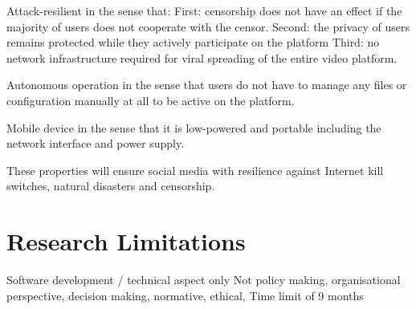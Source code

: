 Attack-resilient in the sense that:
First: censorship does not have an effect if the majority of users does not cooperate with the censor.
Second: the privacy of users remains protected while they actively participate on the platform
Third: no network infrastructure required for viral spreading of the entire video platform.

Autonomous operation in the sense that users do not have to manage any files or configuration manually at all to be active on the platform.

Mobile device in the sense that it is low-powered and portable including the network interface and power supply.

These properties will ensure social media with resilience against Internet kill switches, natural disasters and censorship.



\section{Research Limitations} %
Software development / technical aspect only
Not policy making, organisational perspective, decision making, normative, ethical,
Time limit of 9 months





